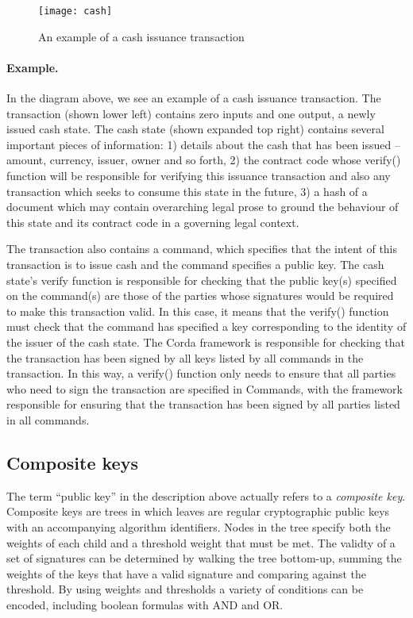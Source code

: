 \documentclass{article}
\begin{document}
\begin{figure}[H]
\texttt{[image: cash]}
\caption{An example of a cash issuance transaction}
\end{figure}

\paragraph{Example.}In the diagram above, we see an example of a cash issuance transaction. The transaction (shown lower
left) contains zero inputs and one output, a newly issued cash state. The cash state (shown expanded top right) contains
several important pieces of information: 1) details about the cash that has been issued -- amount, currency, issuer,
owner and so forth, 2) the contract code whose verify() function will be responsible for verifying this issuance
transaction and also any transaction which seeks to consume this state in the future, 3) a hash of a document which may
contain overarching legal prose to ground the behaviour of this state and its contract code in a governing legal
context.

The transaction also contains a command, which specifies that the intent of this transaction is to issue cash and the
command specifies a public key. The cash state's verify function is responsible for checking that the public key(s)
specified on the command(s) are those of the parties whose signatures would be required to make this transaction valid.
In this case, it means that the verify() function must check that the command has specified a key corresponding to the
identity of the issuer of the cash state. The Corda framework is responsible for checking that the transaction has been
signed by all keys listed by all commands in the transaction. In this way, a verify() function only needs to ensure that
all parties who need to sign the transaction are specified in Commands, with the framework responsible for ensuring that
the transaction has been signed by all parties listed in all commands.

\subsection{Composite keys}\label{sec:composite-keys}

The term ``public key'' in the description above actually refers to a \emph{composite key}. Composite keys are trees in
which leaves are regular cryptographic public keys with an accompanying algorithm identifiers. Nodes in the tree specify
both the weights of each child and a threshold weight that must be met. The validty of a set of signatures can be
determined by walking the tree bottom-up, summing the weights of the keys that have a valid signature and comparing
against the threshold. By using weights and thresholds a variety of conditions can be encoded, including boolean
formulas with AND and OR.
\end{document}
